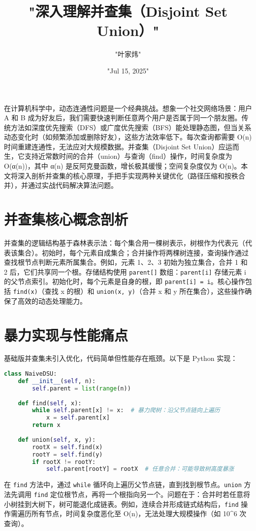 \title{"深入理解并查集（Disjoint Set Union）"}
\author{"叶家炜"}
\date{"Jul 15, 2025"}
\maketitle
在计算机科学中，动态连通性问题是一个经典挑战。想象一个社交网络场景：用户 A 和 B 成为好友后，我们需要快速判断任意两个用户是否属于同一个朋友圈。传统方法如深度优先搜索（DFS）或广度优先搜索（BFS）能处理静态图，但当关系动态变化时（如频繁添加或删除好友），这些方法效率低下。每次查询都需要 O(n) 时间重建连通性，无法应对大规模数据。并查集（Disjoint Set Union）应运而生，它支持近常数时间的合并（union）与查询（find）操作，时间复杂度为 O(α(n))，其中 α(n) 是反阿克曼函数，增长极其缓慢；空间复杂度仅为 O(n)。本文将深入剖析并查集的核心原理，手把手实现两种关键优化（路径压缩和按秩合并），并通过实战代码解决算法问题。\par
\chapter{并查集核心概念剖析}
并查集的逻辑结构基于森林表示法：每个集合用一棵树表示，树根作为代表元（代表该集合）。初始时，每个元素自成集合；合并操作将两棵树连接，查询操作通过查找根节点判断元素所属集合。例如，元素 1、2、3 初始为独立集合，合并 1 和 2 后，它们共享同一个根。存储结构使用 \texttt{parent[]} 数组：\texttt{parent[i]} 存储元素 i 的父节点索引。初始化时，每个元素是自身的根，即 \texttt{parent[i] = i}。核心操作包括 \texttt{find(x)}（查找 x 的根）和 \texttt{union(x, y)}（合并 x 和 y 所在集合），这些操作确保了高效的动态处理能力。\par
\chapter{暴力实现与性能痛点}
基础版并查集未引入优化，代码简单但性能存在瓶颈。以下是 Python 实现：\par
\begin{lstlisting}[language=python]
class NaiveDSU:
    def __init__(self, n):
        self.parent = list(range(n))
    
    def find(self, x):
        while self.parent[x] != x:  # 暴力爬树：沿父节点链向上遍历
            x = self.parent[x]
        return x
    
    def union(self, x, y):
        rootX = self.find(x)
        rootY = self.find(y)
        if rootX != rootY:
            self.parent[rootY] = rootX  # 任意合并：可能导致树高度暴涨
\end{lstlisting}
在 \texttt{find} 方法中，通过 \texttt{while} 循环向上遍历父节点链，直到找到根节点。\texttt{union} 方法先调用 \texttt{find} 定位根节点，再将一个根指向另一个。问题在于：合并时若任意将小树挂到大树下，树可能退化成链表。例如，连续合并形成链式结构后，\texttt{find} 操作需遍历所有节点，时间复杂度恶化至 O(n)，无法处理大规模操作（如 10\^{}6 次查询）。\par
